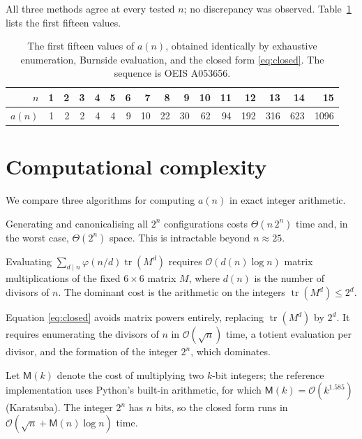 \documentclass[11pt,a4paper]{article}
\theoremstyle{plain}
\theoremstyle{definition}
\theoremstyle{remark}
\DeclareMathOperator{\tr}{tr}
\newcommand{\bigO}{\mathcal{O}}
\numberwithin{equation}{section}
\begin{document}
All three methods agree at every tested $n$; no discrepancy was observed.
Table~\ref{tab:vals} lists the first fifteen values.

\begin{table}[htbp]
\centering
\caption{The first fifteen values of $a(n)$, obtained identically by
exhaustive enumeration, Burnside evaluation, and the closed form
\eqref{eq:closed}. The sequence is OEIS A053656.}
\label{tab:vals}
\smallskip
\small
\begin{tabular}{@{}r rrrrrrrrrrrrrrr@{}}
\toprule
$n$ & 1&2&3&4&5&6&7&8&9&10&11&12&13&14&15\\
\midrule
$a(n)$ & 1&2&2&4&4&9&10&22&30&62&94&192&316&623&1096\\
\bottomrule
\end{tabular}
\end{table}

\section{Computational complexity}\label{sec:complexity}

We compare three algorithms for computing $a(n)$ in exact integer
arithmetic.

\begin{description}[leftmargin=0pt,font=\normalfont\itshape]
\item[Exhaustive enumeration.] Generating and canonicalising all $2^{n}$
configurations costs $\Theta(n\,2^{n})$ time and, in the worst case,
$\Theta(2^{n})$ space. This is intractable beyond $n\approx 25$.
\item[Burnside with matrix powers.] Evaluating $\sum_{d\mid n}
\varphi(n/d)\tr(M^{d})$ requires $\bigO(d(n)\log n)$ matrix
multiplications of the fixed $6\times6$ matrix $M$, where $d(n)$ is the
number of divisors of $n$. The dominant cost is the arithmetic on the
integers $\tr(M^{d})\le 2^{d}$.
\item[Closed form.] Equation \eqref{eq:closed} avoids matrix powers
entirely, replacing $\tr(M^{d})$ by $2^{d}$. It requires enumerating the
divisors of $n$ in $\bigO(\sqrt n)$ time, a totient evaluation per
divisor, and the formation of the integer $2^{n}$, which dominates.
\end{description}

Let $\mathsf M(k)$ denote the cost of multiplying two $k$-bit integers;
the reference implementation uses Python's built-in arithmetic, for which
$\mathsf M(k)=\bigO(k^{1.585})$ (Karatsuba). The integer $2^{n}$ has $n$
bits, so the closed form runs in $\bigO(\sqrt n+\mathsf M(n)\log n)$ time.
\end{document}
